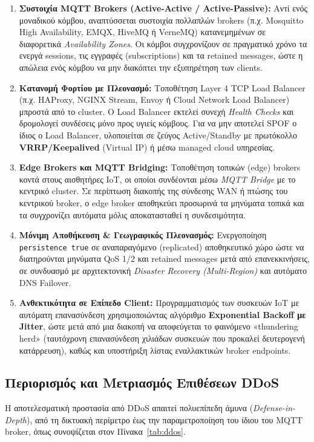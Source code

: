\documentclass[11pt, a4paper]{article}
\begin{document}
\begin{enumerate}
    \item \textbf{Συστοιχία MQTT Brokers (Active-Active / Active-Passive):} Αντί ενός μοναδικού κόμβου, αναπτύσσεται συστοιχία πολλαπλών brokers (π.χ. Mosquitto High Availability, EMQX, HiveMQ ή VerneMQ) κατανεμημένων σε διαφορετικά \textit{Availability Zones}. Οι κόμβοι συγχρονίζουν σε πραγματικό χρόνο τα ενεργά sessions, τις εγγραφές (subscriptions) και τα retained messages, ώστε η απώλεια ενός κόμβου να μην διακόπτει την εξυπηρέτηση των clients.
    \item \textbf{Κατανομή Φορτίου με Πλεονασμό:} Τοποθέτηση Layer 4 TCP Load Balancer (π.χ. HAProxy, NGINX Stream, Envoy ή Cloud Network Load Balancer) μπροστά από το cluster. Ο Load Balancer εκτελεί συνεχή \textit{Health Checks} και δρομολογεί συνδέσεις μόνο προς υγιείς κόμβους. Για να μην αποτελεί SPOF ο ίδιος ο Load Balancer, υλοποιείται σε ζεύγος Active/Standby με πρωτόκολλο \textbf{VRRP/Keepalived} (Virtual IP) ή μέσω managed cloud υπηρεσίας.
    \item \textbf{Edge Brokers και MQTT Bridging:} Τοποθέτηση τοπικών (edge) brokers κοντά στους αισθητήρες IoT, οι οποίοι συνδέονται μέσω \textit{MQTT Bridge} με το κεντρικό cluster. Σε περίπτωση διακοπής της σύνδεσης WAN ή πτώσης του κεντρικού broker, ο edge broker αποθηκεύει προσωρινά τα μηνύματα τοπικά και τα συγχρονίζει αυτόματα μόλις αποκατασταθεί η συνδεσιμότητα.
    \item \textbf{Μόνιμη Αποθήκευση \& Γεωγραφικός Πλεονασμός:} Ενεργοποίηση \texttt{persistence true} σε αναπαραγόμενο (replicated) αποθηκευτικό χώρο ώστε να διατηρούνται μηνύματα QoS 1/2 και retained messages μετά από επανεκκινήσεις, σε συνδυασμό με αρχιτεκτονική \textit{Disaster Recovery (Multi-Region)} και αυτόματο DNS Failover.
    \item \textbf{Ανθεκτικότητα σε Επίπεδο Client:} Προγραμματισμός των συσκευών IoT με αυτόματη επανασύνδεση χρησιμοποιώντας αλγόριθμο \textbf{Exponential Backoff με Jitter}, ώστε μετά από μια διακοπή να αποφεύγεται το φαινόμενο «thundering herd» (ταυτόχρονη επανασύνδεση χιλιάδων συσκευών που προκαλεί δευτερογενή κατάρρευση), καθώς και υποστήριξη λίστας εναλλακτικών broker endpoints.
\end{enumerate}

\subsection{Περιορισμός και Μετριασμός Επιθέσεων DDoS}
Η αποτελεσματική προστασία από DDoS απαιτεί πολυεπίπεδη άμυνα (\textit{Defense-in-Depth}), από τη δικτυακή περίμετρο έως την παραμετροποίηση του ίδιου του MQTT broker, όπως συνοψίζεται στον Πίνακα~\ref{tab:ddos}.
\end{document}

